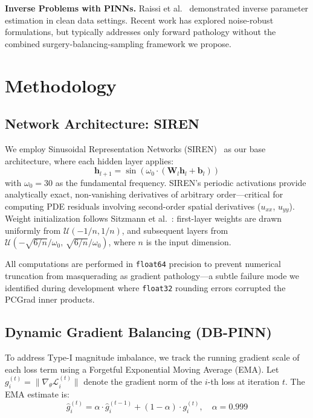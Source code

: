 \documentclass[conference]{IEEEtran}
\begin{document}
\textbf{Inverse Problems with PINNs.} Raissi et al.~\cite{b1} demonstrated inverse parameter estimation in clean data settings. Recent work has explored noise-robust formulations, but typically addresses only forward pathology without the combined surgery-balancing-sampling framework we propose.

\section{Methodology}
\label{sec:method}

\subsection{Network Architecture: SIREN}
\label{sec:siren}

We employ Sinusoidal Representation Networks (SIREN)~\cite{b6} as our base architecture, where each hidden layer applies:
\begin{equation}
    \bm{h}_{l+1} = \sin\!\left(\omega_0 \cdot (\bm{W}_l \bm{h}_l + \bm{b}_l)\right)
    \label{eq:siren}
\end{equation}
with $\omega_0 = 30$ as the fundamental frequency. SIREN's periodic activations provide analytically exact, non-vanishing derivatives of arbitrary order---critical for computing PDE residuals involving second-order spatial derivatives ($u_{xx}$, $u_{yy}$). Weight initialization follows Sitzmann et al.~\cite{b6}: first-layer weights are drawn uniformly from $\mathcal{U}(-1/n, 1/n)$, and subsequent layers from $\mathcal{U}\!\left(-\sqrt{6/n}/\omega_0,\, \sqrt{6/n}/\omega_0\right)$, where $n$ is the input dimension.

All computations are performed in \texttt{float64} precision to prevent numerical truncation from masquerading as gradient pathology---a subtle failure mode we identified during development where \texttt{float32} rounding errors corrupted the PCGrad inner products.

\subsection{Dynamic Gradient Balancing (DB-PINN)}
\label{sec:db}

To address Type-I magnitude imbalance, we track the running gradient scale of each loss term using a Forgetful Exponential Moving Average (EMA). Let $g_i^{(t)} = \|\nabla_\theta \mathcal{L}_i^{(t)}\|$ denote the gradient norm of the $i$-th loss at iteration $t$. The EMA estimate is:
\begin{equation}
    \hat{g}_i^{(t)} = \alpha \cdot \hat{g}_i^{(t-1)} + (1 - \alpha) \cdot g_i^{(t)}, \quad \alpha = 0.999
    \label{eq:ema}
\end{equation}
\end{document}
